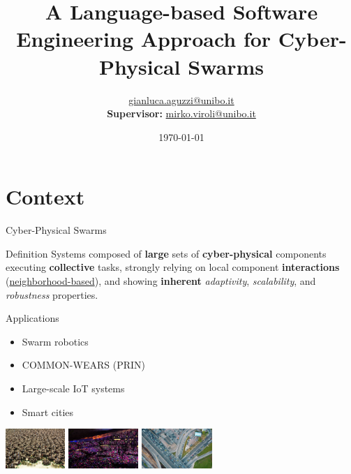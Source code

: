 \documentclass[presentation, 8pt,169]{beamer}\mode<presentation>{\usetheme{AMSBolognaFC}}
\title[A Soft-Eng Approach for CPSWs]
{A Language-based Software Engineering Approach for Cyber-Physical Swarms}
\author[\sspeaker{G.Aguzzi}]
{\speaker{Gianluca Aguzzi} \href{mailto:gianluca.aguzzi@unibo.it}{gianluca.aguzzi@unibo.it} \\
\textbf{Supervisor:} \speaker{Mirko Viroli} \href{mailto:mirko.viroli@unibo.it}{mirko.viroli@unibo.it}}
\institute[DISI, Univ.\ Bologna]
{%
\textsc{Alma Mater Studiorum} -- Universit{\`a} di Bologna \\[0.1cm]
\textbf{PhD defense}\\[0.15cm]
}
\date[\today]{\today}
\begin{document}

\frame{\titlepage}

\section*{\refname}

\section{Context}
\begin{frame}{Cyber-Physical Swarms}
  \begin{exampleblock}{Definition}
    Systems composed of \textbf{large} sets of \textbf{cyber-physical} components executing \textbf{collective} tasks, strongly relying on local component \textbf{interactions} (\underline{neighborhood-based}), and showing \textbf{inherent} \emph{adaptivity}, \emph{scalability}, and \emph{robustness} properties.
\end{exampleblock}
\begin{alertblock}{Applications}
  \begin{multicols}{3}
    \begin{itemize}
      \item Swarm robotics
      \item COMMON-WEARS (PRIN)%
      \item Large-scale IoT systems
      \item Smart cities
    \end{itemize}
  \end{multicols}
  \begin{center}
    \includegraphics[height=1.5cm]{img/swarms.jpg}
    \includegraphics[height=1.5cm]{img/coldplay.jpg}
    \includegraphics[height=1.5cm]{img/traffic.jpg} 

\end{center}
\end{alertblock}
\end{frame}
\end{document}
